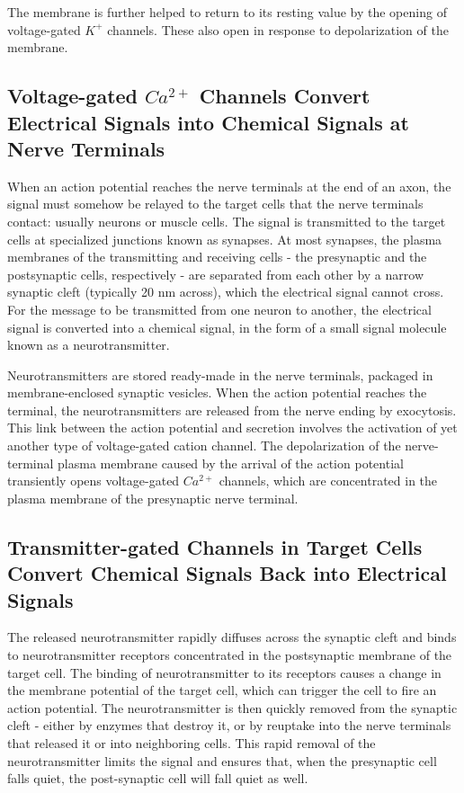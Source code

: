 The membrane is further helped to return to its resting value by the opening
of voltage-gated $K^{+}$ channels. These also open in response to depolarization
of the membrane.

\subsection{Voltage-gated $Ca^{2+}$ Channels Convert Electrical Signals into Chemical Signals at Nerve Terminals}

When an action potential reaches the nerve terminals at the end of an
axon, the signal must somehow be relayed to the target cells that the
nerve terminals contact: usually neurons or muscle cells. The signal is
transmitted to the target cells at specialized junctions known as synapses.
At most synapses, the plasma membranes of the transmitting and
receiving cells - the presynaptic and the postsynaptic cells, respectively -
are separated from each other by a narrow synaptic cleft (typically 20 nm
across), which the electrical signal cannot cross. For the
message to be transmitted from one neuron to another, the electrical
signal is converted into a chemical signal, in the form of a small signal
molecule known as a neurotransmitter.

Neurotransmitters are stored ready-made in the nerve terminals, packaged
in membrane-enclosed synaptic vesicles.
When the action potential reaches the terminal, the neurotransmitters
are released from the nerve ending by exocytosis. This link between the
action potential and secretion involves the
activation of yet another type of voltage-gated cation channel. The
depolarization of the nerve-terminal plasma membrane caused by the
arrival of the action potential transiently opens voltage-gated $Ca^{2+}$ channels,
which are concentrated in the plasma membrane of the presynaptic nerve terminal.

\subsection{Transmitter-gated Channels in Target Cells Convert Chemical Signals Back into Electrical Signals}

The released neurotransmitter rapidly diffuses across the synaptic cleft
and binds to neurotransmitter receptors concentrated in the postsynaptic
membrane of the target cell. The binding of neurotransmitter to its
receptors causes a change in the membrane potential of the target cell,
which can trigger the cell to fire an action potential. The neurotransmitter
is then quickly removed from the synaptic cleft - either by enzymes that
destroy it, or by reuptake into the nerve terminals that released it or into
neighboring cells. This rapid removal of the neurotransmitter limits the
signal and ensures that, when the presynaptic cell falls quiet, the post-synaptic
cell will fall quiet as well.

